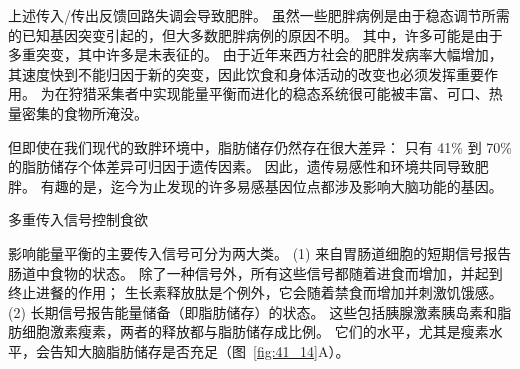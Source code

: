 上述传入/传出反馈回路失调会导致肥胖。
虽然一些肥胖病例是由于稳态调节所需的已知基因突变引起的，但大多数肥胖病例的原因不明。
其中，许多可能是由于多重突变，其中许多是未表征的。
由于近年来西方社会的肥胖发病率大幅增加，其速度快到不能归因于新的突变，因此饮食和身体活动的改变也必须发挥重要作用。
为在狩猎采集者中实现能量平衡而进化的稳态系统很可能被丰富、可口、热量密集的食物所淹没。


但即使在我们现代的致胖环境中，脂肪储存仍然存在很大差异：
只有 41\% 到 70\% 的脂肪储存个体差异可归因于遗传因素。
因此，遗传易感性和环境共同导致肥胖。
有趣的是，迄今为止发现的许多易感基因位点都涉及影响大脑功能的基因。


多重传入信号控制食欲

影响能量平衡的主要传入信号可分为两大类。
(1) 来自胃肠道细胞的短期信号报告肠道中食物的状态。
除了一种信号外，所有这些信号都随着进食而增加，并起到终止进餐的作用；
生长素释放肽是个例外，它会随着禁食而增加并刺激饥饿感。
(2) 长期信号报告能量储备（即脂肪储存）的状态。 
这些包括胰腺激素胰岛素和脂肪细胞激素瘦素，两者的释放都与脂肪储存成比例。
它们的水平，尤其是瘦素水平，会告知大脑脂肪储存是否充足（图~\ref{fig:41_14}A）。


